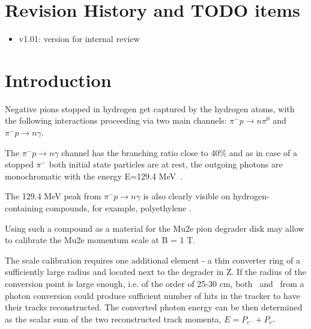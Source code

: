 \documentclass[12pt]{article}
\begin{document}
% 


\newpage
\section {Revision History and TODO items}

\begin{itemize}
\item
  v1.01: version for internal review
\end{itemize}

% 
\newpage
\section {Introduction}
Negative pions stopped in hydrogen get captured by the hydrogen atoms, 
with the following interactions proceeding via two main channels:
$\pi^- p \to n\pi^0$ and $\pi^- p \to n \gamma$.

The $\pi^- p \to n \gamma$ channel has the branching ratio close to 40\%
and as in case of a stopped $\pi^-$ both initial state particles are at rest,
the outgoing photons are monochromatic with the energy E=129.4 MeV~\cite{RPC_1972_Bistirlich_PhysRevC.5.1867}.

The 129.4 MeV peak from $\pi^- p \to n \gamma$ is also clearly visible on hydrogen-containing
compounds, for example, polyethylene \cite{RPC_1972_Bistirlich_PhysRevC.5.1867}.

Using such a compound as a material for the Mu2e pion degrader disk may allow to calibrate
the Mu2e momentum scale at B = 1 T.

The scale calibration requires one additional element - a thin converter ring
of a sufficiently large radius and located next to the degrader in Z.
If the radius of the conversion point is large enough, i.e. of the order of 25-30 cm,
both \eplus\ and \eminus\ from a photon conversion could produce sufficient
number of hits in the tracker to have their tracks reconstructed.
The converted photon energy can be then determined as the scalar sum
of the two reconstructed track momenta, $E = P_{e^-} + P_{e^+}$
\end{document}
